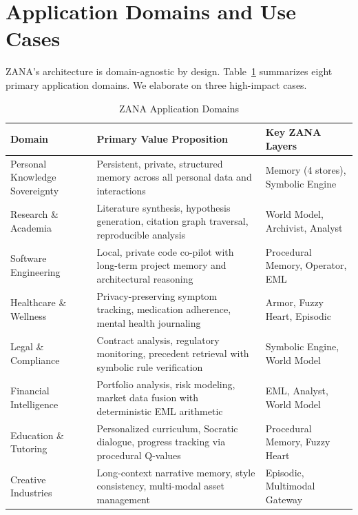 \documentclass[12pt,a4paper]{article}
\begin{document}
\section{Application Domains and Use Cases}
\label{sec:usecases}

ZANA's architecture is domain-agnostic by design. Table~\ref{tab:usecases} summarizes eight
primary application domains. We elaborate on three high-impact cases.

\begin{table}[H]
\centering
\caption{ZANA Application Domains}
\label{tab:usecases}
\begin{tabular}{@{}p{3.2cm}p{6.8cm}p{3.2cm}@{}}
\toprule
\textbf{Domain} & \textbf{Primary Value Proposition} & \textbf{Key ZANA Layers}\\
\midrule
Personal Knowledge Sovereignty
  & Persistent, private, structured memory across all personal data and interactions
  & Memory (4 stores), Symbolic Engine\\[4pt]
Research \& Academia
  & Literature synthesis, hypothesis generation, citation graph traversal, reproducible analysis
  & World Model, Archivist, Analyst\\[4pt]
Software Engineering
  & Local, private code co-pilot with long-term project memory and architectural reasoning
  & Procedural Memory, Operator, EML\\[4pt]
Healthcare \& Wellness
  & Privacy-preserving symptom tracking, medication adherence, mental health journaling
  & Armor, Fuzzy Heart, Episodic\\[4pt]
Legal \& Compliance
  & Contract analysis, regulatory monitoring, precedent retrieval with symbolic rule verification
  & Symbolic Engine, World Model\\[4pt]
Financial Intelligence
  & Portfolio analysis, risk modeling, market data fusion with deterministic EML arithmetic
  & EML, Analyst, World Model\\[4pt]
Education \& Tutoring
  & Personalized curriculum, Socratic dialogue, progress tracking via procedural Q-values
  & Procedural Memory, Fuzzy Heart\\[4pt]
Creative Industries
  & Long-context narrative memory, style consistency, multi-modal asset management
  & Episodic, Multimodal Gateway\\
\bottomrule
\end{tabular}
\end{table}
\end{document}
